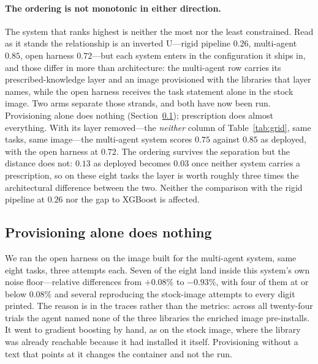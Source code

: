 \paragraph{The ordering is not monotonic in either direction.}
The system that ranks highest is neither the most nor the least constrained.
Read as it stands the relationship is an inverted U---rigid pipeline $0.26$,
multi-agent $0.85$, open harness $0.72$---but each system enters in the
configuration it ships in, and those differ in more than architecture: the
multi-agent row carries its prescribed-knowledge layer and an image provisioned
with the libraries that layer names, while the open harness receives the task
statement alone in the stock image. Two arms separate those strands, and both
have now been run. Provisioning alone does nothing
(Section~\ref{sec:matched}); prescription does almost everything. With its layer
removed---the \emph{neither} column of Table~\ref{tab:grid}, same tasks, same
image---the multi-agent system scores $0.75$ against $0.85$ as deployed, with the
open harness at $0.72$. The ordering survives the separation but the distance
does not: $0.13$ as deployed becomes $0.03$ once neither system carries a
prescription, so on these eight tasks the layer is worth roughly three times the
architectural difference between the two. Neither the comparison with the rigid
pipeline at $0.26$ nor the gap to XGBoost is affected.

\subsection{Provisioning alone does nothing}
\label{sec:matched}

We ran the open harness on the image built for the multi-agent system, same
eight tasks, three attempts each. Seven of the eight land inside this system's
own noise floor---relative differences from $+0.08\%$ to $-0.93\%$, with four of
them at or below $0.08\%$ and several reproducing the stock-image attempts to
every digit printed. The reason is in the traces rather than the metrics: across all twenty-four
trials the agent named none of the three libraries the enriched image
pre-installs. It went to gradient boosting by hand, as on the stock image, where
the library was already reachable because it had installed it itself.
Provisioning without a text that points at it changes the container and not the
run.

